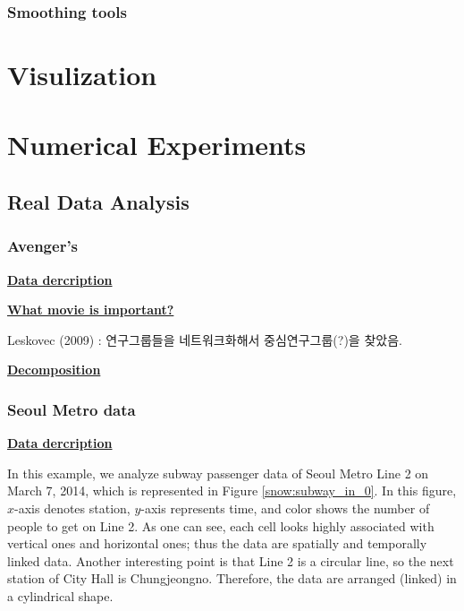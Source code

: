 \documentclass[preprint, review, 12pt]{article}
\theoremstyle{definition}
\theoremstyle{remark}
\begin{document}
\subsubsection{Smoothing tools}


\section{Visulization}

\section{Numerical Experiments}

\subsection{Real Data Analysis}
\subsubsection{Avenger's}
\noindent\textbf{\underline{Data dercription}}

\noindent\textbf{\underline{What movie is important?}}

Leskovec (2009) : 연구그룹들을 네트워크화해서 중심연구그룹(?)을 찾았음. 

\noindent\textbf{\underline{Decomposition}}


\subsubsection{Seoul Metro data}
\noindent\textbf{\underline{Data dercription}}

In this example, we analyze subway passenger data of Seoul Metro Line 2 on March 7, 2014, which is represented in Figure \ref{snow:subway_in_0}. In this figure, $x$-axis denotes station, $y$-axis represents time, and color shows the number of people to get on Line 2. As one can see, each cell looks highly associated with vertical ones and horizontal ones; thus the data are spatially and temporally linked data. Another interesting point is that Line 2 is a circular line, so the next station of City Hall is Chungjeongno. Therefore, the data are arranged (linked) in a cylindrical shape.
\end{document}
